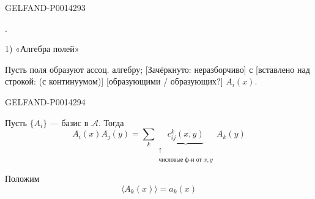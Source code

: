\begin{GelfandAdjacentEvidence}{GELFAND-P001429}{3}


.

1) «Алгебра полей»

Пусть поля образуют ассоц. алгебру; [Зачёркнуто: неразборчиво]
с [вставлено над строкой: (с континуумом)] [образующими / образующих?] \(A_i(x)\).
\end{GelfandAdjacentEvidence}
\begin{GelfandAdjacentEvidence}{GELFAND-P001429}{4}

\end{GelfandAdjacentEvidence}


Пусть \(\{A_i\}\) — базис в \(\mathcal A\). Тогда
\[
A_i(x)A_j(y)=\sum_k
\underset{\substack{\uparrow\\ \text{числовые ф-и от }x,y}}
  {\underbrace{c_{ij}^k(x,y)}}\,A_k(y)
\]

Положим
\[
\langle A_k(x)\rangle=a_k(x)
\]


